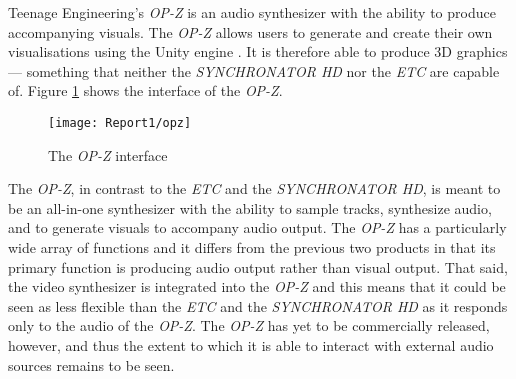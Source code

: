 \documentclass[../../main_report1.tex]{subfiles}
\begin{document}
Teenage Engineering's \textit{OP-Z} is an audio synthesizer with the ability to produce accompanying visuals. The \textit{OP-Z} allows users to generate and create their own visualisations using the Unity engine \cite{Teenageengineering}. It is therefore able to produce 3D graphics --- something that neither the \textit{SYNCHRONATOR HD} nor the \textit{ETC} are capable of. Figure \ref{fig:opz} shows the interface of the \textit{OP-Z}. \par
\begin{figure}
  \texttt{[image: Report1/opz]}
  \caption{The \textit{OP-Z} interface \cite{Teenageengineering}}
  \label{fig:opz}
\end{figure}
The \textit{OP-Z}, in contrast to the \textit{ETC} and the \textit{SYNCHRONATOR HD}, is meant to be an all-in-one synthesizer with the ability to sample tracks, synthesize audio, and to generate visuals to accompany audio output.  The \textit{OP-Z} has a particularly wide array of functions and it differs from the previous two products in that its primary function is producing audio output rather than visual output. That said, the video synthesizer is integrated into the \textit{OP-Z} and this means that it could be seen as less flexible than the \textit{ETC} and the \textit{SYNCHRONATOR HD} as it responds only to the audio of the \textit{OP-Z}. The \textit{OP-Z} has yet to be commercially released, however, and thus the extent to which it is able to interact with external audio sources remains to be seen.
\end{document}

